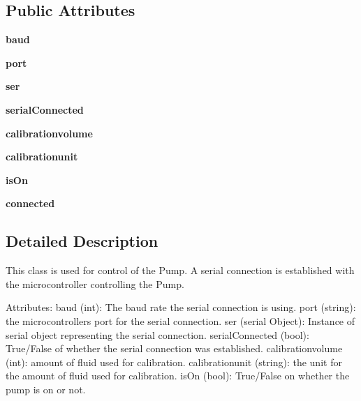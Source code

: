 \subsection*{Public Attributes}
\begin{DoxyCompactItemize}
\item 
\mbox{\label{class_pump_1_1_three_pump_abc5f0f88b998c6ffbcac39f509f8276d}} 
{\bfseries baud}
\item 
\mbox{\label{class_pump_1_1_three_pump_a0ac7dc541ee013051f95f0f0e1f135bb}} 
{\bfseries port}
\item 
\mbox{\label{class_pump_1_1_three_pump_affc15ae738d1b9a9f6c330314138a8be}} 
{\bfseries ser}
\item 
\mbox{\label{class_pump_1_1_three_pump_a3fe83154cc2e42c20cf211fd812db5e9}} 
{\bfseries serial\+Connected}
\item 
\mbox{\label{class_pump_1_1_three_pump_a6f8e620481c8705f1dd6f1886e28631a}} 
{\bfseries calibrationvolume}
\item 
\mbox{\label{class_pump_1_1_three_pump_ab39d6d2b1f6e88050284dc1d6674c5c2}} 
{\bfseries calibrationunit}
\item 
\mbox{\label{class_pump_1_1_three_pump_a78f3c8cc148540b9d31d61a6728ca5c4}} 
{\bfseries is\+On}
\item 
\mbox{\label{class_pump_1_1_three_pump_a9a86481d8a79b60e2a859fe64f029e83}} 
{\bfseries connected}
\end{DoxyCompactItemize}


\subsection{Detailed Description}
\begin{DoxyVerb}This class is used for control of the Pump. A serial connection is established with the microcontroller controlling the Pump.

Attributes:
    baud (int): The baud rate the serial connection is using.
    port (string): the microcontrollers port for the serial connection.
    ser (serial Object): Instance of serial object representing the serial connection.
    serialConnected (bool): True/False of whether the serial connection was established.
    calibrationvolume (int): amount of fluid used for calibration.
    calibrationunit (string): the unit for the amount of fluid used for calibration.
    isOn (bool): True/False on whether the pump is on or not.\end{DoxyVerb}
 

